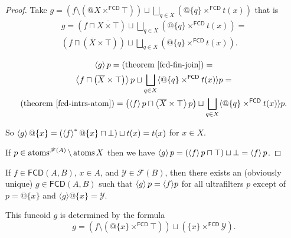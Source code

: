 \begin{proof}
  Take $g = (f \setminus (@X \times^{\mathsf{FCD}} \top)) \sqcup
  \bigsqcup_{q \in X} (@\{ q \} \times^{\mathsf{FCD}} t (x))$ that is
\begin{multline*}
g = \left( f \sqcap \overline{X \times \top} \right) \sqcup \bigsqcup_{q \in
  X} (@\{ q \} \times^{\mathsf{FCD}} t (x)) = \\\left( f \sqcap \left(
  \overline{X} \times \top \right) \right) \sqcup \bigsqcup_{q \in X} (@\{ q \}
  \times^{\mathsf{FCD}} t (x)).
\end{multline*}

\begin{multline*}
  \supfun{g} p = \text{(theorem~\ref{fcd-fin-join})} =\\ \left\langle f
  \sqcap \left( \overline{X} \times \top \right) \right\rangle p \sqcup
  \bigsqcup_{q \in X} \langle @\{ q \} \times^{\mathsf{FCD}} t (x)
  \rangle p = \\ \text{(theorem~\ref{fcd-intrs-atom})} = \left( \supfun{f} p \sqcap
  \left\langle \overline{X} \times \top \right\rangle p \right) \sqcup
  \bigsqcup_{q \in X} \langle @\{ q \} \times^{\mathsf{FCD}} t (x)
  \rangle p.
\end{multline*}

  So $\left\langle g\right\rangle @\{ x \} = (\left\langle f\right\rangle^{\ast} @\{ x \} \sqcap
  \bot) \sqcup t (x) = t (x)$ for $x \in X$.

  If $p \in \operatorname{atoms}^{\mathscr{F} (A)} \setminus \operatorname{atoms} X$ then we
  have $\left\langle g\right\rangle p = (\left\langle f\right\rangle p \sqcap \top) \sqcup \bot =
  \left\langle f\right\rangle p$.
\end{proof}

\begin{cor}
  If $f \in \mathsf{FCD} (A, B)$, $x \in A$, and $\mathcal{Y} \in
  \mathscr{F} (B)$, then there exists an (obviously unique) $g \in
  \mathsf{FCD} (A, B)$ such that $\left\langle g\right\rangle p = \langle f
  \rangle p$ for all ultrafilters $p$ except of $p = @\{ x \}$ and $\langle g
  \rangle @\{ x \} = \mathcal{Y}$.

  This funcoid $g$ is determined by the formula
  \[ g = (f \setminus (@\{ x \} \times^{\mathsf{FCD}} \top)) \sqcup (\{
     x \} \times^{\mathsf{FCD}} \mathcal{Y}) . \]
\end{cor}

